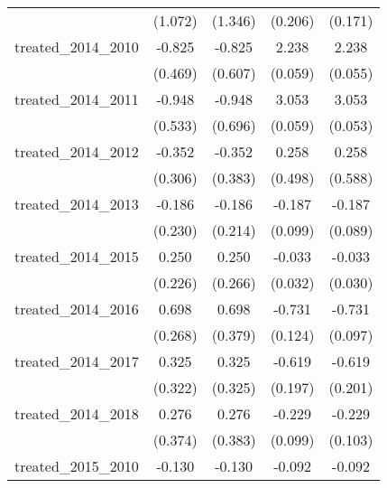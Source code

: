 {\begin{tabular}{l*{4}{c}}
            &     (1.072)         &     (1.346)         &     (0.206)         &     (0.171)         \\
[1em]
treated\_2014\_2010&      -0.825         &      -0.825         &       2.238\sym{***}&       2.238\sym{***}\\
            &     (0.469)         &     (0.607)         &     (0.059)         &     (0.055)         \\
[1em]
treated\_2014\_2011&      -0.948         &      -0.948         &       3.053\sym{***}&       3.053\sym{***}\\
            &     (0.533)         &     (0.696)         &     (0.059)         &     (0.053)         \\
[1em]
treated\_2014\_2012&      -0.352         &      -0.352         &       0.258         &       0.258         \\
            &     (0.306)         &     (0.383)         &     (0.498)         &     (0.588)         \\
[1em]
treated\_2014\_2013&      -0.186         &      -0.186         &      -0.187         &      -0.187\sym{*}  \\
            &     (0.230)         &     (0.214)         &     (0.099)         &     (0.089)         \\
[1em]
treated\_2014\_2015&       0.250         &       0.250         &      -0.033         &      -0.033         \\
            &     (0.226)         &     (0.266)         &     (0.032)         &     (0.030)         \\
[1em]
treated\_2014\_2016&       0.698\sym{**} &       0.698         &      -0.731\sym{***}&      -0.731\sym{***}\\
            &     (0.268)         &     (0.379)         &     (0.124)         &     (0.097)         \\
[1em]
treated\_2014\_2017&       0.325         &       0.325         &      -0.619\sym{**} &      -0.619\sym{**} \\
            &     (0.322)         &     (0.325)         &     (0.197)         &     (0.201)         \\
[1em]
treated\_2014\_2018&       0.276         &       0.276         &      -0.229\sym{*}  &      -0.229\sym{*}  \\
            &     (0.374)         &     (0.383)         &     (0.099)         &     (0.103)         \\
[1em]
treated\_2015\_2010&      -0.130         &      -0.130         &      -0.092         &      -0.092         \\

\end{tabular}}
